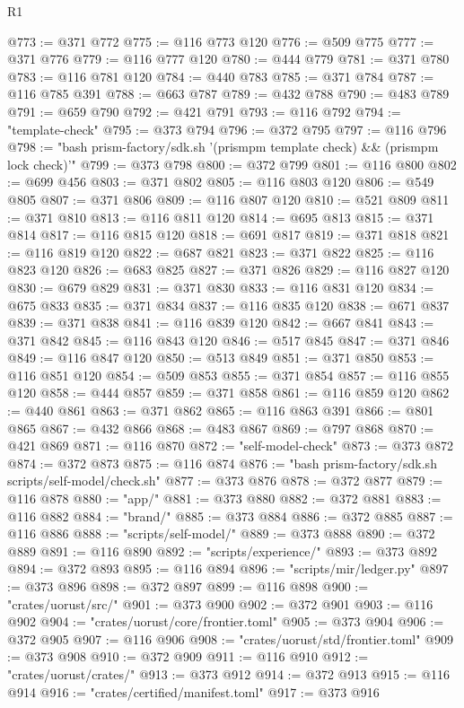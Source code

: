 \begin{lexlean}{R1}
\begin{coremodule}
@773 := @371 @772
@775 := @116 @773 @120
@776 := @509 @775
@777 := @371 @776
@779 := @116 @777 @120
@780 := @444 @779
@781 := @371 @780
@783 := @116 @781 @120
@784 := @440 @783
@785 := @371 @784
@787 := @116 @785 @391
@788 := @663 @787
@789 := @432 @788
@790 := @483 @789
@791 := @659 @790
@792 := @421 @791
@793 := @116 @792
@794 := "template-check"
@795 := @373 @794
@796 := @372 @795
@797 := @116 @796
@798 := "bash prism-factory/sdk.sh '(prismpm template check) && (prismpm lock check)'"
@799 := @373 @798
@800 := @372 @799
@801 := @116 @800
@802 := @699 @456
@803 := @371 @802
@805 := @116 @803 @120
@806 := @549 @805
@807 := @371 @806
@809 := @116 @807 @120
@810 := @521 @809
@811 := @371 @810
@813 := @116 @811 @120
@814 := @695 @813
@815 := @371 @814
@817 := @116 @815 @120
@818 := @691 @817
@819 := @371 @818
@821 := @116 @819 @120
@822 := @687 @821
@823 := @371 @822
@825 := @116 @823 @120
@826 := @683 @825
@827 := @371 @826
@829 := @116 @827 @120
@830 := @679 @829
@831 := @371 @830
@833 := @116 @831 @120
@834 := @675 @833
@835 := @371 @834
@837 := @116 @835 @120
@838 := @671 @837
@839 := @371 @838
@841 := @116 @839 @120
@842 := @667 @841
@843 := @371 @842
@845 := @116 @843 @120
@846 := @517 @845
@847 := @371 @846
@849 := @116 @847 @120
@850 := @513 @849
@851 := @371 @850
@853 := @116 @851 @120
@854 := @509 @853
@855 := @371 @854
@857 := @116 @855 @120
@858 := @444 @857
@859 := @371 @858
@861 := @116 @859 @120
@862 := @440 @861
@863 := @371 @862
@865 := @116 @863 @391
@866 := @801 @865
@867 := @432 @866
@868 := @483 @867
@869 := @797 @868
@870 := @421 @869
@871 := @116 @870
@872 := "self-model-check"
@873 := @373 @872
@874 := @372 @873
@875 := @116 @874
@876 := "bash prism-factory/sdk.sh scripts/self-model/check.sh"
@877 := @373 @876
@878 := @372 @877
@879 := @116 @878
@880 := "app/"
@881 := @373 @880
@882 := @372 @881
@883 := @116 @882
@884 := "brand/"
@885 := @373 @884
@886 := @372 @885
@887 := @116 @886
@888 := "scripts/self-model/"
@889 := @373 @888
@890 := @372 @889
@891 := @116 @890
@892 := "scripts/experience/"
@893 := @373 @892
@894 := @372 @893
@895 := @116 @894
@896 := "scripts/mir/ledger.py"
@897 := @373 @896
@898 := @372 @897
@899 := @116 @898
@900 := "crates/uorust/src/"
@901 := @373 @900
@902 := @372 @901
@903 := @116 @902
@904 := "crates/uorust/core/frontier.toml"
@905 := @373 @904
@906 := @372 @905
@907 := @116 @906
@908 := "crates/uorust/std/frontier.toml"
@909 := @373 @908
@910 := @372 @909
@911 := @116 @910
@912 := "crates/uorust/crates/"
@913 := @373 @912
@914 := @372 @913
@915 := @116 @914
@916 := "crates/certified/manifest.toml"
@917 := @373 @916

\end{coremodule}
\end{lexlean}
